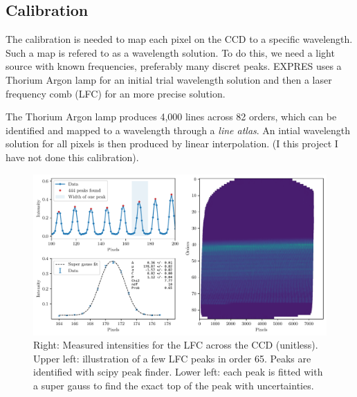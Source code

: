 \subsection{Calibration} 

    The calibration is needed to map each pixel on the CCD to a specific wavelength. Such a map is refered to as a wavelength solution. To do this, we need a light source with known frequencies, preferably many discret peaks. EXPRES uses a Thorium Argon lamp for an initial trial wavelength solution and then a laser frequency comb (LFC) for an more precise solution.
    
    The Thorium Argon lamp produces 4,000 lines across 82 orders, which can be identified and mapped to a wavelength through a \emph{line atlas}. An intial wavelength solution for all pixels is then produced by linear interpolation. (I this project I have not done this calibration).


    \begin{figure}%
        \begin{wide}  
            \includegraphics[width=\textwidth]{figures/LFC_peak_fitting_overview.pdf}
            \caption{Right: Measured intensities for the LFC across the CCD (unitless). Upper left: illustration of a few LFC peaks in order 65. Peaks are identified with scipy peak finder. Lower left: each peak is fitted with a super gauss to find the exact top of the peak with uncertainties.}
            \label{fig:LFC_CCD}
        \end{wide}
    \end{figure}
    


